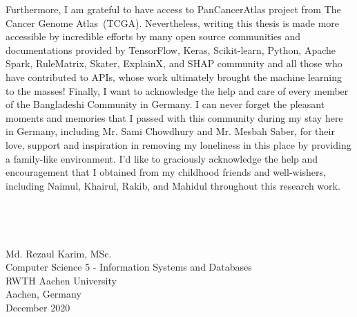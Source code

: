 \begin{acknowledgements}
    \hspace*{5mm} Furthermore, I am grateful to have access to PanCancerAtlas project from The Cancer Genome Atlas~(TCGA). Nevertheless, writing this thesis is made more accessible by incredible efforts by many open source communities and documentations provided by TensorFlow, Keras, Scikit-learn, Python, Apache Spark, RuleMatrix, Skater, ExplainX, and SHAP community and all those who have contributed to APIs, whose work ultimately brought the machine learning to the masses! Finally, I want to acknowledge the help and care of every member of the Bangladeshi Community in Germany. I can never forget the pleasant moments and memories that I passed with this community during my stay here in Germany, including Mr. Sami Chowdhury and Mr. Mesbah Saber, for their love, support and inspiration in removing my loneliness in this place by providing a family-like environment. I'd like to graciously acknowledge the help and encouragement that I obtained from my childhood friends and well-wishers, including Naimul, Khairul, Rakib, and Mahidul throughout this research work. \\ \\ %
    \\ \\ \\ 
    \flushright Md. Rezaul Karim, MSc. \\
    Computer Science 5 - Information Systems and Databases\\
    RWTH Aachen University\\ 
    Aachen, Germany \\
    December 2020
\end{acknowledgements}